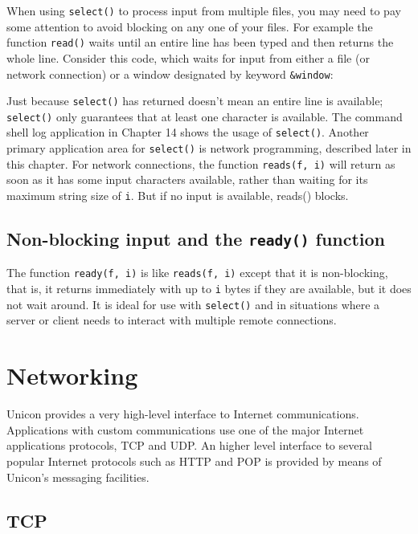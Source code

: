 When using \texttt{select()} to process input from multiple files, you
may need to pay some attention to avoid blocking on any one of your
files. For example the function \texttt{read()} waits until an entire
line has been typed and then returns the whole line. Consider this
code, which waits for input from either a file (or network connection)
or a window designated by keyword \texttt{\&window}:


Just because \texttt{select()} has returned doesn't
mean an entire line is available; \texttt{select()} only guarantees
that at least one character is available. The command shell log
application in Chapter 14 shows the usage of \texttt{select()}. Another
primary application area for \texttt{select()} is network programming,
described later in this chapter. For network connections, the function
\texttt{reads(f, i)} will return as soon as it has some input
characters available, rather than waiting for its maximum string size
of \texttt{i}. But if no input is available, reads() blocks.

\subsection*{Non-blocking input and the \texttt{ready()} function}

The function \texttt{ready(f, i)} is like \texttt{reads(f, i)} except
that it is non-blocking, that is, it returns immediately with up to
\texttt{i} bytes if they are available, but it does not wait around. It
is ideal for use with \texttt{select()} and in situations where a
server or client needs to interact with multiple remote connections.

\section[Networking]{Networking}
Unicon provides a very high-level interface to
Internet communications. Applications with custom
communications use one of the major Internet
applications protocols, TCP and UDP. An higher level
interface to several popular Internet protocols such as HTTP and POP is
provided by means of Unicon's messaging facilities.

\subsection*{TCP}

